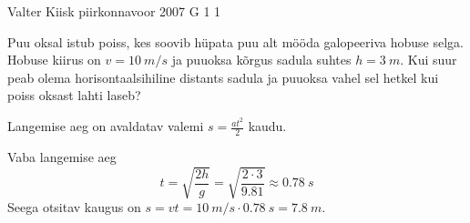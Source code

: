 {Valter Kiisk} %
{piirkonnavoor} %
{2007} %
{G 1} %
{1} %
{
\ifStatement
Puu oksal istub poiss, kes soovib hüpata puu alt mööda galopeeriva hobuse selga. Hobuse kiirus on $v = \SI{10}{m/s}$ ja puuoksa kõrgus sadula suhtes $h = \SI{3}{m}$. Kui suur peab olema horisontaalsihiline distants sadula ja puuoksa vahel sel hetkel kui poiss oksast lahti laseb?
\fi


\ifHint
Langemise aeg on avaldatav valemi $s = \frac{at^2}{2}$ kaudu.
\fi


\ifSolution
Vaba langemise aeg
\[
t=\sqrt{\frac{2 h}{g}}=\sqrt{\frac{2 \cdot 3}{\num{9,81}}} \approx \SI{0,78}{s}
\]
Seega otsitav kaugus on $s = vt = \SI{10}{m/s} \cdot \SI{0,78}{s} = \SI{7,8}{m}$.
\fi
}